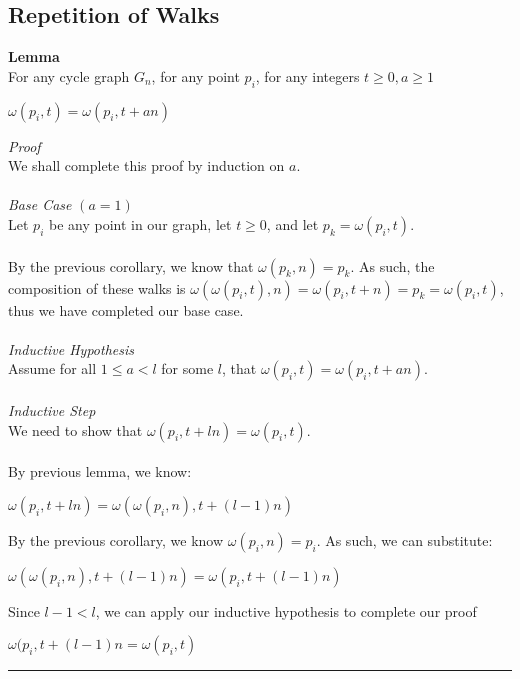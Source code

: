 \documentclass[a4paper,12pt]{article}
\begin{document}
\subsection{Repetition of Walks}

\begin{tcolorbox}
\textbf{Lemma}\\
For any cycle graph $G_n$, for any point $p_i$, for any integers $t \geq 0, a \geq 1$
\begin{center}
$\omega(p_i, t) = \omega(p_i, t + an)$
\end{center}
\end{tcolorbox}
\noindent
\textit{Proof}\\
We shall complete this proof by induction on $a$.\\
\\
\textit{Base Case} $(a = 1)$\\
Let $p_i$ be any point in our graph, let $t \geq 0$, and let $p_k = \omega(p_i, t)$.\\
\\
By the previous corollary, we know that $\omega(p_k, n) = p_k$. As such, the composition of these walks is $\omega(\omega(p_i, t), n) = \omega(p_i, t + n) = p_k = \omega(p_i, t)$, thus we have completed our base case.\\
\\
\textit{Inductive Hypothesis}\\
Assume for all $1 \leq a < l$ for some $l$, that $\omega(p_i, t) = \omega(p_i, t + an)$.\\
\\
\textit{Inductive Step}\\
We need to show that $\omega(p_i, t + ln) = \omega(p_i, t)$.\\
\\
By previous lemma, we know:
\begin{center}
$\omega(p_i, t + ln) = \omega(\omega(p_i, n), t + (l - 1)n)$
\end{center}
By the previous corollary, we know $\omega(p_i, n) = p_i$. As such, we can substitute:
\begin{center}
$\omega(\omega(p_i, n), t + (l - 1)n) = \omega(p_i, t + (l - 1)n)$
\end{center}
Since $l - 1 < l$, we can apply our inductive hypothesis to complete our proof
\begin{center}
$\omega(p_i, t + (l - 1)n = \omega(p_i, t)$
\end{center}

\begin{center}
\noindent\rule{8cm}{0.4pt}
\end{center}
\noindent
\\
\end{document}
